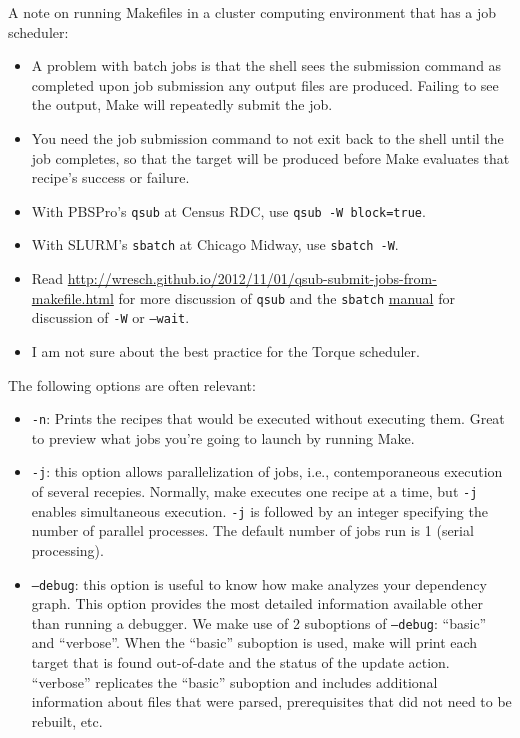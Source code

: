 A note on running Makefiles in a cluster computing environment that has a job scheduler:
\begin{itemize}
	\item A problem with batch jobs is that the shell sees the submission command as completed upon job submission any output files are produced.
	Failing to see the output, Make will repeatedly submit the job.
	\item You need the job submission command to not exit back to the shell until the job completes, so that the target will be produced before Make evaluates that recipe's success or failure.
	\item With PBSPro's \texttt{qsub} at Census RDC, use \texttt{qsub -W block=true}.
	\item With SLURM's \texttt{sbatch} at Chicago Midway, use \texttt{sbatch -W}.
	\item Read \url{http://wresch.github.io/2012/11/01/qsub-submit-jobs-from-makefile.html} for more discussion of \texttt{qsub} and the \texttt{sbatch} \href{https://slurm.schedmd.com/sbatch.html}{manual} for discussion of \texttt{-W} or \texttt{--wait}.
	\item I am not sure about the best practice for the Torque scheduler.
\end{itemize}


The following options are often relevant:
\begin{itemize}
	\item \texttt{-n}: Prints the recipes that would be executed without executing them. Great to preview what jobs you're going to launch by running Make.
	\item \texttt{-j}: this option allows parallelization of jobs, i.e., contemporaneous execution of several recepies.
	Normally, make executes one recipe at a time, but \texttt{-j} enables simultaneous execution.
	\texttt{-j} is followed by an integer specifying the number of parallel processes.
	The default number of jobs run is 1 (serial processing).
	\item \texttt{--debug}: this option is useful to know how make analyzes your dependency graph. This option provides the most detailed information available other than running a debugger.
	We make use of 2 suboptions of \texttt{--debug}: ``basic'' and ``verbose''.
	When the ``basic'' suboption is used, make will print each target that is found out-of-date and the status of the update action.
	``verbose'' replicates the ``basic'' suboption and includes additional information about files that were parsed, prerequisites that did not need to be rebuilt, etc.
\end{itemize}
